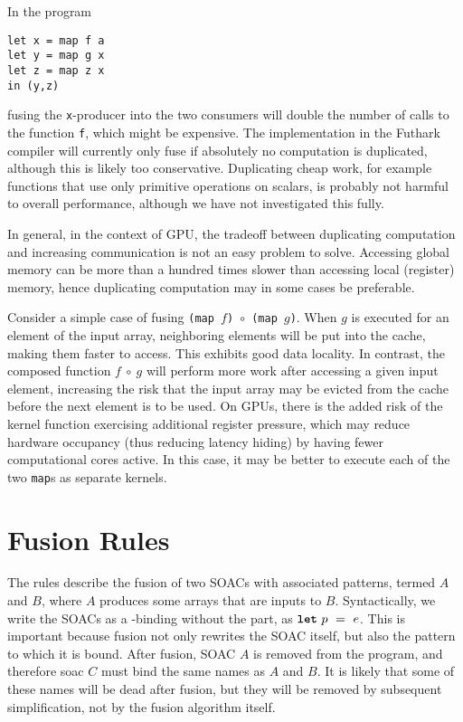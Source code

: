 \begin{description}[style=nextline]
\item[Computation may be duplicated.]

In the program
\begin{lstlisting}
let x = map f a
let y = map g x
let z = map z x
in (y,z)
\end{lstlisting}
fusing the \texttt{x}-producer into the two consumers will double the
number of calls to the function \texttt{f}, which might be expensive.
The implementation in the Futhark compiler will currently only fuse if
absolutely no computation is duplicated, although this is likely too
conservative.  Duplicating cheap work, for example functions that use
only primitive operations on scalars, is probably not harmful to
overall performance, although we have not investigated this fully.

In general, in the context of GPU, the tradeoff between duplicating
computation and increasing communication is not an easy problem to
solve.  Accessing global memory can be more than a hundred times
slower than accessing local (register) memory, hence duplicating
computation may in some cases be preferable.

\item[Can reduce memory locality.]

  Consider a simple case of fusing
  \texttt{(map~$f$)~$\circ$~(map~$g$)}.  When $g$ is executed for an
  element of the input array, neighboring elements will be put into
  the cache, making them faster to access.  This exhibits good data
  locality.  In contrast, the composed function $f~\circ~g$ will
  perform more work after accessing a given input element, increasing
  the risk that the input array may be evicted from the cache before
  the next element is to be used.  On GPUs, there is the added risk of
  the kernel function exercising additional register pressure, which
  may reduce hardware occupancy (thus reducing latency hiding) by
  having fewer computational cores active.  In this case, it may be
  better to execute each of the two \texttt{map}s as separate kernels.
\end{description}

\newpage
\section{Fusion Rules}
\label{sec:fusionalgebra}

The rules describe the fusion of two SOACs with associated patterns,
termed $A$ and $B$, where $A$ produces some arrays that are inputs to
$B$.  Syntactically, we write the SOACs as a -binding without
the  part, as $\mbox{\texttt{\bfseries{let}}}~p~=~e$.  This is important because
fusion not only rewrites the SOAC itself, but also the pattern to
which it is bound.  After fusion, SOAC $A$ is removed from the
program, and therefore soac $C$ must bind the same names as $A$ and
$B$.  It is likely that some of these names will be dead after fusion,
but they will be removed by subsequent simplification, not by the
fusion algorithm itself.

